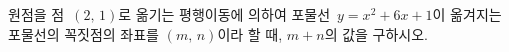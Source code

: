 원점을 점~$(2,\,1)$로 옮기는 평행이동에 의하여 포물선~$y=x^2+6x+1$이 옮겨지는 포물선의 꼭짓점의 좌표를 $(m,\,n)$이라 할 때, $m+n$의 값을 구하시오.
